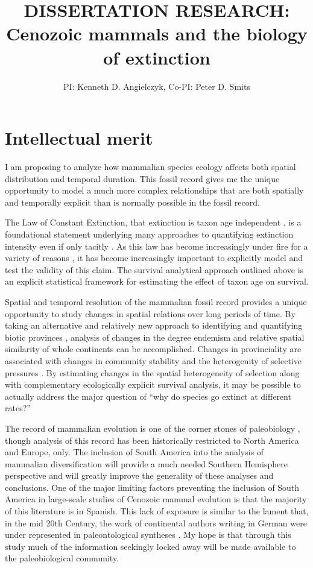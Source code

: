 \documentclass[11pt,letterpaper]{article}
\title{\uppercase{Dissertation Research:}\\ Cenozoic mammals and the biology of extinction}
\author{PI: Kenneth D. Angielczyk, Co-PI: Peter D. Smits}
\date{}
\begin{document}
\linenumbers
\modulolinenumbers[2]

\setcounter{secnumdepth}{0}

\maketitle

\section{Intellectual merit}
I am proposing to analyze how mammalian species ecology affects both spatial distribution and temporal duration. This fossil record gives me the unique opportunity to model a much more complex relationships that are both spatially and temporally explicit than is normally possible in the fossil record. 

The Law of Constant Extinction, that extinction is taxon age independent \citep{VanValen1973}, is a foundational statement underlying many approaches to quantifying extinction intensity even if only tacitly \citep{Alroy2014a,Foote1996e,Foote1997c,Foote2000,Raup1975,Sepkoski1975}. As this law has become increasingly under fire for a variety of reasons \citep{Drake2014,Raup1975,Sepkoski1975,Finnegan2008}, it has become increasingly important to explicitly model and test the validity of this claim. The survival analytical approach outlined above is an explicit statistical framework for estimating the effect of taxon age on survival.

Spatial and temporal resolution of the mammalian fossil record provides a unique opportunity to study changes in spatial relations over long periods of time. By taking an alternative and relatively new approach to identifying and quantifying biotic provinces \citep{Sidor2013,Vilhena2013b,Vilhena2013}, analysis of changes in the degree endemism and relative spatial similarity of whole continents can be accomplished. Changes in provinciality are associated with changes in community stability and the heterogenity of selective pressures \citep{Sidor2013,Vilhena2013}. By estimating changes in the spatial heterogeneity of selection along with complementary ecologically explicit survival analysis, it may be possible to actually address the major question of ``why do species go extinct at different rates?''

The record of mammalian evolution is one of the corner stones of paleobiology \citep{Simpson1944}, though analysis of this record has been historically restricted to North America and Europe, only. The inclusion of South America into the analysis of mammalian diversification will provide a much needed Southern Hemisphere perspective and will greatly improve the generality of these analyses and conclusions. One of the major limiting factors preventing the inclusion of South America in large-scale studies of Cenozoic mammal evolution is that the majority of this literature is in Spanish. This lack of exposure is similar to the lament that, in the mid 20th Century, the work of continental authors writing in German were under represented in paleontological syntheses \citep{Gould1979a}. My hope is that through this study much of the information seekingly locked away will be made available to the paleobiological community.
\end{document}
